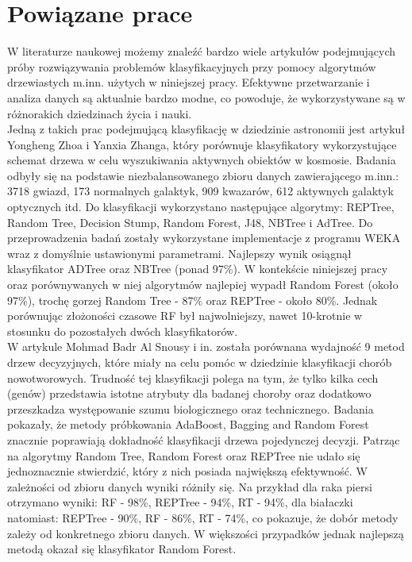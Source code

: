 \documentclass[conference]{IEEEtran}
\begin{document}
\section{Powiązane prace}
	W literaturze naukowej możemy znaleźć bardzo wiele artykułów podejmujących próby rozwiązywania problemów klasyfikacyjnych przy pomocy algorytmów drzewiastych m.inn. użytych w niniejszej pracy. Efektywne przetwarzanie i analiza danych są aktualnie bardzo modne, co powoduje, że wykorzystywane są w różnorakich dziedzinach życia i nauki.\\ 
\indent	Jedną z takich prac podejmującą klasyfikację w dziedzinie astronomii jest artykuł Yongheng Zhoa i Yanxia Zhanga, który porównuje klasyfikatory wykorzystujące schemat drzewa w celu wyszukiwania aktywnych obiektów w kosmosie. Badania odbyły się na podstawie niezbalansowanego zbioru danych zawierającego m.inn.: 3718 gwiazd, 173 normalnych galaktyk, 909 kwazarów, 612 aktywnych galaktyk optycznych itd. Do klasyfikacji wykorzystano następujące algorytmy: REPTree, Random Tree, Decision Stump, Random Forest, J48, NBTree i AdTree. Do przeprowadzenia badań zostały wykorzystane implementacje z programu WEKA wraz z domyślnie ustawionymi parametrami. Najlepszy wynik osiągnął klasyfikator ADTree oraz NBTree (ponad 97\%). W kontekście niniejszej pracy oraz porównywanych w niej algorytmów najlepiej wypadł Random Forest (około 97\%), trochę gorzej Random Tree - 87\% oraz REPTree - około 80\%. Jednak porównując złożoności czasowe RF był najwolniejszy, nawet 10-krotnie w stosunku do pozostałych dwóch klasyfikatorów. \cite{b1} \\
\indent W artykule Mohmad Badr Al Snousy i in. została porównana wydajność 9 metod drzew decyzyjnych, które miały na celu pomóc w dziedzinie klasyfikacji chorób nowotworowych. Trudność tej klasyfikacji polega na tym, że tylko kilka cech (genów) przedstawia istotne atrybuty dla badanej choroby oraz dodatkowo przeszkadza występowanie szumu biologicznego oraz technicznego. Badania pokazały, że metody próbkowania AdaBoost, Bagging and Random Forest znacznie poprawiają dokładność klasyfikacji drzewa pojedynczej decyzji. Patrząc na algorytmy Random Tree, Random Forest oraz REPTree nie udało się jednoznacznie stwierdzić, który z nich posiada największą efektywność. W zależności od zbioru danych wyniki różniły się. Na przykład dla raka piersi otrzymano wyniki: RF - 98\%, REPTree - 94\%, RT - 94\%, dla białaczki natomiast: REPTree - 90\%, RF - 86\%, RT - 74\%, co pokazuje, że dobór metody zależy od konkretnego zbioru danych. W większości przypadków jednak najlepszą metodą okazał się klasyfikator Random Forest. \cite{b4} \\
\end{document}
